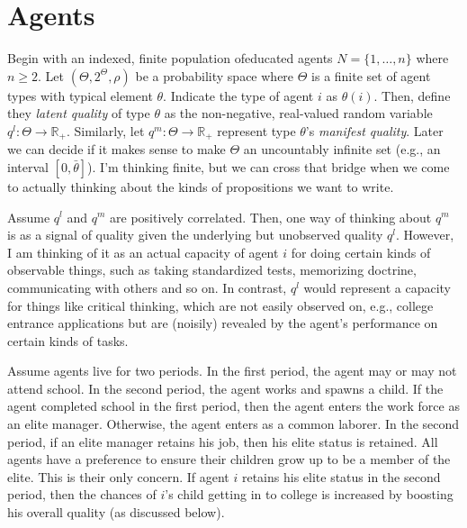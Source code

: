\documentclass[
12pt,
titlepage,
reqno,
]{article}%
\begin{document}
	\section{Agents}
	
	Begin with an indexed, finite population ofeducated agents $N=\{1,\ldots,n\}$ where $n\ge 2$. 
	Let $(\Theta,2^\Theta,\rho)$ be a probability space where $\Theta$ is a finite set of agent types with typical element $\theta$.
	Indicate the type of agent $i$ as $\theta(i)$. 
	Then, define they \textit{latent quality} of type $\theta$ as the non-negative, real-valued random variable $q^l:\Theta\rightarrow\mathbb{R}_+$.
	Similarly, let $q^m:\Theta\rightarrow\mathbb{R}_+$ represent type $\theta$'s \textit{manifest quality}.
	Later we can decide if it makes sense to make $\Theta$ an  uncountably infinite set (e.g., an interval $[0,\bar{\theta}]$).
	I'm thinking finite, but we can cross that bridge when we come to actually thinking about the kinds of propositions we want to write.
	
	Assume $q^l$ and $q^m$ are positively correlated.
	Then, one way of thinking about $q^m$ is as a signal of quality given the underlying but unobserved quality $q^l$.
	However, I am thinking of it as an actual capacity of agent $i$ for doing certain kinds of observable things, such as taking standardized tests, memorizing doctrine, communicating with others and so on.
	In contrast, $q^l$ would represent a capacity for things like critical thinking, which are not easily observed on, e.g., college entrance applications but are (noisily) revealed by the agent's performance on certain kinds of tasks.
	
	Assume agents live for two periods.
	In the first period, the agent may or may not attend school.
	In the second period, the agent works and spawns a child.
	If the agent completed school in the first period, then the agent enters the work force as an elite manager. 
	Otherwise, the agent enters as a common laborer.
	In the second period, if an elite manager retains his job, then his elite status is retained.
	All agents have a preference to ensure their children grow up to be a member of the elite.
	This is their only concern.  
	If agent $i$ retains his elite status in the second period, then the chances of $i$'s child getting in to college is increased by boosting his overall quality (as discussed below).
	
\end{document}
